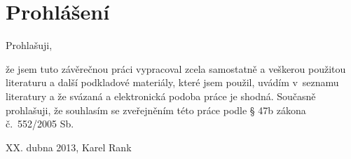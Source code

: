 \section*{Prohlášení}
Prohlašuji,

že jsem tuto závěrečnou práci vypracoval zcela samostatně a veškerou použitou literaturu a další podkladové materiály, které jsem použil, uvádím v~seznamu literatury a že svázaná a elektronická podoba práce je shodná. Současně prohlašuji, že souhlasím se zveřejněním této práce podle § 47b zákona č.~552/2005 Sb.

\bigskip
\begin{flushright}
XX. dubna 2013, Karel Rank
\end{flushright}

\newpage